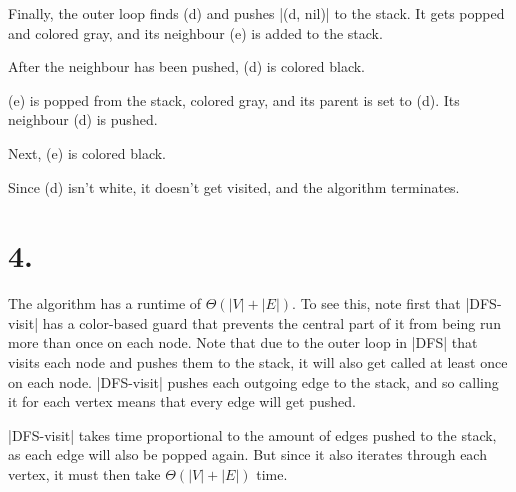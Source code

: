 \documentclass[a4paper]{article}
\begin{document}
Finally, the outer loop finds (d) and pushes \code|(d, nil)| to the stack. It gets popped and colored gray, and its neighbour (e) is added to the stack.


After the neighbour has been pushed, (d) is colored black.


(e) is popped from the stack, colored gray, and its parent is set to (d). Its neighbour (d) is pushed.


Next, (e) is colored black.


Since (d) isn't white, it doesn't get visited, and the algorithm terminates.

\section*{4.}

The algorithm has a runtime of \(\Theta(|V| + |E|)\). To see this, note first that \code|DFS-visit| has a color-based guard that prevents the central part of it from being run more than once on each node. Note that due to the outer loop in \code|DFS| that visits each node and pushes them to the stack, it will also get called at least once on each node. \code|DFS-visit| pushes each outgoing edge to the stack, and so calling it for each vertex means that every edge will get pushed.

\code|DFS-visit| takes time proportional to the amount of edges pushed to the stack, as each edge will also be popped again. But since it also iterates through each vertex, it must then take \(\Theta(|V| + |E|)\) time.
\end{document}
